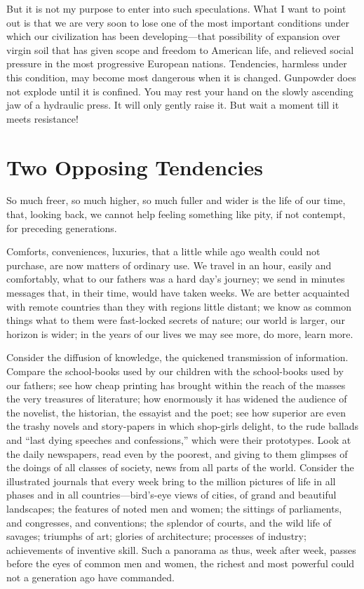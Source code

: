\documentclass{book}
\begin{document}
But it is not my purpose to enter into such speculations. What I want to point out is that we are very soon to lose one of the most important conditions under which our civilization has been developing—that possibility of expansion over virgin soil that has given scope and freedom to American life, and relieved social pressure in the most progressive European nations. Tendencies, harmless under this condition, may become most dangerous when it is changed. Gunpowder does not explode until it is confined. You may rest your hand on the slowly ascending jaw of a hydraulic press. It will only gently raise it. But wait a moment till it meets resistance!

\chapter{Two Opposing Tendencies}
\label{chapter-4}
So much freer, so much higher, so much fuller and wider is the life of our time, that, looking back, we cannot help feeling something like pity, if not contempt, for preceding generations.

Comforts, conveniences, luxuries, that a little while ago wealth could not purchase, are now matters of ordinary use. We travel in an hour, easily and comfortably, what to our fathers was a hard day’s journey; we send in minutes messages that, in their time, would have taken weeks. We are better acquainted with remote countries than they with regions little distant; we know as common things what to them were fast-locked secrets of nature; our world is larger, our horizon is wider; in the years of our lives we may see more, do more, learn more.

Consider the diffusion of knowledge, the quickened transmission of information. Compare the school-books used by our children with the school-books used by our fathers; see how cheap printing has brought within the reach of the masses the very treasures of literature; how enormously it has widened the audience of the novelist, the historian, the essayist and the poet; see how superior are even the trashy novels and story-papers in which shop-girls delight, to the rude ballads and “last dying speeches and confessions,” which were their prototypes. Look at the daily newspapers, read even by the poorest, and giving to them glimpses of the doings of all classes of society, news from all parts of the world. Consider the illustrated journals that every week bring to the million pictures of life in all phases and in all countries—bird’s-eye views of cities, of grand and beautiful landscapes; the features of noted men and women; the sittings of parliaments, and congresses, and conventions; the splendor of courts, and the wild life of savages; triumphs of art; glories of architecture; processes of industry; achievements of inventive skill. Such a panorama as thus, week after week, passes before the eyes of common men and women, the richest and most powerful could not a generation ago have commanded.
\end{document}

